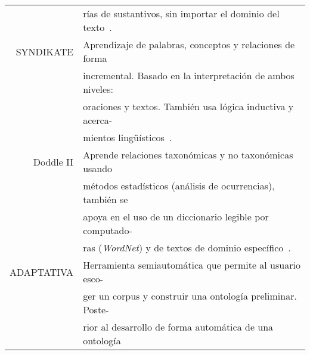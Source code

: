 \begin{table}[H]
\begin{tabular}{rl}
		& rías de sustantivos, sin importar el dominio del texto~\cite{ref:56}.\\
		SYNDIKATE & Aprendizaje de palabras, conceptos y relaciones de forma \\
		& incremental. Basado en la interpretación de ambos niveles: \\
		& oraciones y textos. También usa lógica inductiva y acerca- \\
		& mientos lingüísticos~\cite{ref:58,ref:57}.\\
		Doddle II & Aprende relaciones taxonómicas y no taxonómicas usando \\
		& métodos estadísticos (análisis de ocurrencias), también se \\
		& apoya en el uso de un diccionario legible por computado- \\
		& ras (\textit{WordNet}) y de textos de dominio específico~\cite{ref:59}.\\
		ADAPTATIVA & Herramienta semiautomática que permite al usuario esco- \\
		& ger un corpus y construir una ontología preliminar. Poste- \\
		& rior al desarrollo de forma automática de una ontología
	\end{tabular}
\end{table}

